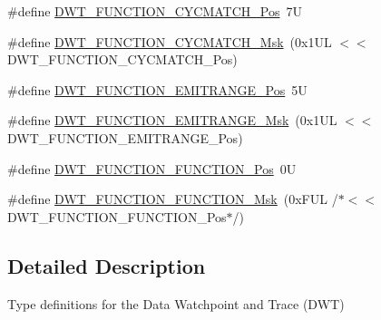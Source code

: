 \begin{DoxyCompactItemize}
\item 
\#define \hyperlink{group___c_m_s_i_s___d_w_t_ga4b65d79ca37ae8010b4a726312413efd}{D\-W\-T\-\_\-\-F\-U\-N\-C\-T\-I\-O\-N\-\_\-\-C\-Y\-C\-M\-A\-T\-C\-H\-\_\-\-Pos}~7\-U
\item 
\#define \hyperlink{group___c_m_s_i_s___d_w_t_ga8e2ed09bdd33a8f7f7ce0444f5f3bb25}{D\-W\-T\-\_\-\-F\-U\-N\-C\-T\-I\-O\-N\-\_\-\-C\-Y\-C\-M\-A\-T\-C\-H\-\_\-\-Msk}~(0x1\-U\-L $<$$<$ D\-W\-T\-\_\-\-F\-U\-N\-C\-T\-I\-O\-N\-\_\-\-C\-Y\-C\-M\-A\-T\-C\-H\-\_\-\-Pos)
\item 
\#define \hyperlink{group___c_m_s_i_s___d_w_t_ga41d5b332216baa8d29561260a1b85659}{D\-W\-T\-\_\-\-F\-U\-N\-C\-T\-I\-O\-N\-\_\-\-E\-M\-I\-T\-R\-A\-N\-G\-E\-\_\-\-Pos}~5\-U
\item 
\#define \hyperlink{group___c_m_s_i_s___d_w_t_gad46dd5aba29f2e28d4d3f50b1d291f41}{D\-W\-T\-\_\-\-F\-U\-N\-C\-T\-I\-O\-N\-\_\-\-E\-M\-I\-T\-R\-A\-N\-G\-E\-\_\-\-Msk}~(0x1\-U\-L $<$$<$ D\-W\-T\-\_\-\-F\-U\-N\-C\-T\-I\-O\-N\-\_\-\-E\-M\-I\-T\-R\-A\-N\-G\-E\-\_\-\-Pos)
\item 
\#define \hyperlink{group___c_m_s_i_s___d_w_t_ga5797b556edde2bbaa4d33dcdb1a891bb}{D\-W\-T\-\_\-\-F\-U\-N\-C\-T\-I\-O\-N\-\_\-\-F\-U\-N\-C\-T\-I\-O\-N\-\_\-\-Pos}~0\-U
\item 
\#define \hyperlink{group___c_m_s_i_s___d_w_t_ga3b2cda708755ecf5f921d08b25d774d1}{D\-W\-T\-\_\-\-F\-U\-N\-C\-T\-I\-O\-N\-\_\-\-F\-U\-N\-C\-T\-I\-O\-N\-\_\-\-Msk}~(0x\-F\-U\-L /$\ast$$<$$<$ D\-W\-T\-\_\-\-F\-U\-N\-C\-T\-I\-O\-N\-\_\-\-F\-U\-N\-C\-T\-I\-O\-N\-\_\-\-Pos$\ast$/)
\end{DoxyCompactItemize}


\subsection{Detailed Description}
Type definitions for the Data Watchpoint and Trace (D\-W\-T) 

